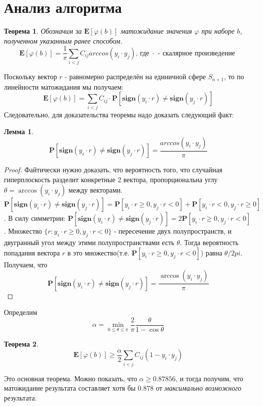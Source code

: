 \documentclass[12pt]{article}
\newtheorem{theorem}{Теорема}
\newtheorem{lemma}{Лемма}
\begin{document}
\section{Анализ алгоритма}
\begin{theorem}
Обозначим за $\mathbf{E}[\varphi(b)]$ матожидание значения $\varphi$ при наборе $b$, полученном указанным ранее способом.
$$
\mathbf{E}[\varphi(b)] = 
\frac{1}{\pi} \sum_{i < j} C_{ij} arccos(y_i \cdot y_j) \text{, где } \cdot \text{ - скалярное произведение }
$$
\end{theorem}
Поскольку вектор $r$ - равномерно распределён на единичной сфере $S_{n + 1}$, то по линейности матожидания мы получаем:
$$
\mathbf{E}\left[\varphi(b)\right] = \sum_{i < j}C_{ij} \cdot 
\mathbf{P} \left[ \mathbf{sign}(y_i \cdot r) \neq \mathbf{sign} (y_j \cdot r) \right]
$$
Следовательно, для доказательства теоремы надо доказать следующий факт:
\begin{lemma}
$$
\mathbf{P} \left[ \mathbf{sign}(y_i \cdot r) \neq \mathbf{sign}(y_j \cdot r) \right] = \frac{arccos (y_i \cdot y_j )}{\pi}
$$
\end{lemma}

\begin{proof}
Файтически нужно доказать, что вероятность того, что случайная гиперплоскость разделит конкретные 2 вектора, пропорциональна углу $\theta = \arccos (y_i \cdot y_j)$ между векторами. $\mathbf{P} \left[ \mathbf{sign}(y_i \cdot r) \neq \mathbf{sign} (y_j \cdot r) \right] = \mathbf{P} \left[y_i \cdot r \geq 0, y_j \cdot r < 0\right] + 
\mathbf{P} \left[y_i \cdot r < 0, y_j \cdot r \geq 0\right]$. В силу симметрии:
$\mathbf{P} \left[ \mathbf{sign}(y_i \cdot r) \neq \mathbf{sign} (y_j \cdot r) \right] = 2\mathbf{P} \left[y_i \cdot r \geq 0, y_j \cdot r < 0\right]$. Множество $\{r: y_i \cdot r \geq 0, y_j \cdot r < 0\}$ - пересечение двух полупространств, и двугранный угол между этими полупространствами есть $\theta$. Тогда вероятность попадания вектора $r$ в это множество(т.е. $\mathbf{P}\left[
y_i \cdot r \geq 0, y_j \cdot r < 0
\right]$) равна $\theta / 2pi$. Получаем, что $$\mathbf{P}\left[
\mathbf{sign}(y_i \cdot r) \neq \mathbf{sign}(y_j \cdot r)
\right] = \frac{\arccos (y_i \cdot y_j)}{\pi}$$
\end{proof}

Определим
$$\alpha = \min_{0 \leq \theta \leq \pi} \frac{2}{\pi} \frac{\theta}{1 - \cos \theta}$$
\begin{theorem}
$$
\mathbf{E}[\varphi(b)] \geq \frac{\alpha}{2} \sum_{i < j}
    C_{ij}(1 - y_i \cdot y_j)
$$
\end{theorem}
Это основная теорема. Можно показать, что $\alpha \geq 0.87856$, и тогда получим, что матожидание результата составляет хотя бы $0.878$ от \textit{максимально возможного} результата.
\end{document}
